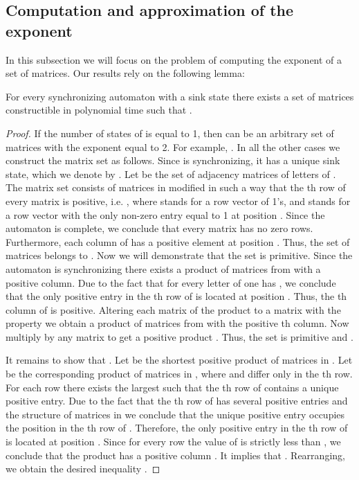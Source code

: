 \documentclass[a4paper,USenglish]{lipics}
\theoremstyle{definition}
\begin{document}
\subsection{Computation and approximation of the exponent}
In this subsection we will focus on the problem of computing the exponent of a set of  matrices. Our results rely on the following lemma:
\begin{lemma}
\label{lemma:zeronzrc}
For every synchronizing automaton  with a sink state there exists a set of  matrices  constructible in polynomial time such that .
\end{lemma}
\begin{proof}
If the number of states of  is equal to 1, then  can be an arbitrary set of matrices with the exponent equal to 2. For example,
.
In all the other cases we construct the matrix set  as follows. Since  is synchronizing, it has a unique sink state, which we denote by . Let  be the set of adjacency matrices of letters of . The matrix set  consists of matrices in  modified in such a way that the th row of every matrix is positive, i.e. , where  stands for a row vector of 1's, and  stands for a row vector with the only non-zero entry equal to 1 at position . Since the automaton  is complete, we conclude that every matrix  has no zero rows. Furthermore, each column of  has a positive element at position . Thus, the set of matrices  belongs to . Now we will demonstrate that the set  is primitive. Since the automaton  is synchronizing there exists a product  of matrices from  with a positive column. Due to the fact that for every letter  of  one has , we conclude that the only positive entry in the th row of  is located at position . Thus, the th column of  is positive. Altering each matrix  of the product  to a matrix  with the property  we obtain a product  of matrices from  with the positive th column. 
Now multiply by any matrix  to get a positive product . Thus, the set  is primitive and .

It remains to show that . Let  be the shortest positive product of matrices in . Let  be the corresponding product of matrices in , where  and  differ only in the th row. For each row  there exists the largest  such that the th row of  contains a unique positive entry. 
Due to the fact that the th row of  has several positive entries and the structure of matrices in  we conclude that the unique positive entry occupies the position  in the th row of . 
Therefore, the only positive entry in the th row of  is located at position . Since for every row the value of  is strictly less than , we conclude that the product  has a positive column . It implies that . Rearranging, we obtain the desired inequality .
\end{proof}
\end{document}

